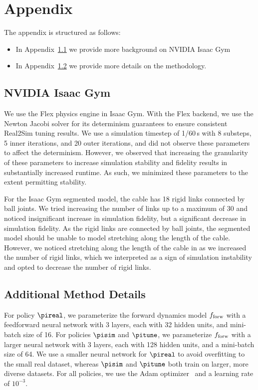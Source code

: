 \section{Appendix}\label{app}
The appendix is structured as follows:

\begin{itemize}
    \item In Appendix~\ref{app:isaac-gym} we provide more background on NVIDIA Isaac Gym 
    \item In Appendix~\ref{app:method-details} we provide more details on the methodology.
\end{itemize}


\subsection{NVIDIA Isaac Gym}\label{app:isaac-gym}

We use the Flex physics engine in Isaac Gym. With the Flex backend, we use the Newton Jacobi solver for its determinism guarantees to ensure consistent Real2Sim tuning results. We use a simulation timestep of 1/60\,s with 8 substeps, 5 inner iterations, and 20 outer iterations, and did not observe these parameters to affect the determinism. However, we observed that increasing the granularity of these parameters to increase simulation stability and fidelity results in substantially increased runtime. As such, we minimized these parameters to the extent permitting stability.

For the Isaac Gym segmented model, the cable has 18 rigid links connected by ball joints. We tried increasing the number of links up to a maximum of 30 and noticed insignificant increase in simulation fidelity, but a significant decrease in simulation fidelity. As the rigid links are connected by ball joints, the segmented model should be unable to model stretching along the length of the cable. However, we noticed stretching along the length of the cable in as we increased the number of rigid links, which we interpreted as a sign of simulation instability and opted to decrease the number of rigid links.  

\subsection{Additional Method Details}\label{app:method-details}

For policy $\pireal$, we parameterize the forward dynamics model $f_{\rm forw}$ with a feedforward neural network with 3 layers, each with 32 hidden units, and mini-batch size of 16. For policies $\pisim$ and $\pitune$, we parameterize $f_{\rm forw}$ with a larger neural network with 3 layers, each with 128 hidden units, and a mini-batch size of 64. We use a smaller neural network for $\pireal$ to avoid overfitting to the small real dataset, whereas $\pisim$ and $\pitune$ both train on larger, more diverse datasets. For all policies, we use the Adam optimizer~\cite{adam2015} and a learning rate of $10^{-3}$.

